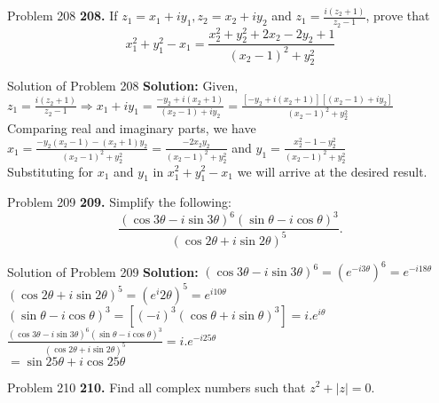 \documentclass[aspectratio=169,8pt]{beamer}
\begin{document}
\begin{frame}{Problem 208}
  \textbf{208.} If $z_1 = x_1 + iy_1, z_2 = x_2 + iy_2$ and $z_1 = \frac{i(z_2 + 1)}{z_2 - 1}$,  prove that
    $$x_1^2 + y_1^2 - x_1 = \frac{x_2^2 + y_2^2 + 2x_2 - 2y_2 + 1}{(x_2 - 1)^2 + y_2^2}$$
\end{frame}
\begin{frame}{Solution of Problem 208}
  \textbf{Solution:} Given, $z_1 = \frac{i(z_2 + 1)}{z_2 - 1} \Rightarrow x_1 + iy_1 = \frac{-y_2 + i(x_2 + 1)}{(x_2 - 1) + iy_2}
  = \frac{[-y_2 + i(x_2 + 1)][(x_2 - 1) + iy_2]}{(x_2 - 1)^2 + y_2^2}$
  \\\vspace*{0.2cm}
  Comparing real and imaginary parts, we have
  \\\vspace*{0.2cm}
  $x_1 = \frac{-y_2(x_2 - 1) -(x_2 + 1)y_2}{(x_2 - 1)^2 + y_2^2} = \frac{-2x_2y_2}{(x_2 - 1)^2 + y_2^2}$ and $y_1 = \frac{x_2^2 - 1
    - y_2^2}{(x_2 - 1)^2 + y_2^2}$
  \\\vspace*{0.2cm}
  Substituting for $x_1$ and $y_1$ in $x_1^2 + y_1^2 - x_1$ we will arrive at the desired result.
\end{frame}
\begin{frame}{Problem 209}
  \textbf{209.} Simplify the following:
  $$\frac{(\cos3\theta - i\sin3\theta)^6(\sin\theta - i\cos\theta)^3}{(\cos2\theta + i\sin2\theta)^5}.$$
\end{frame}
\begin{frame}{Solution of Problem 209}
  \textbf{Solution:} $(\cos3\theta - i\sin3\theta)^6 = (e^{-i3\theta})^6 = e^{-i18\theta}$
  \\\vspace*{0.2cm}
  $(\cos2\theta + i\sin2\theta)^5 = (e^i2\theta)^5 = e^{i10\theta}$
  \\\vspace*{0.2cm}
  $(\sin\theta - i\cos\theta)^3 = [(-i)^3(\cos\theta + i\sin\theta)^3] = i.e^{i\theta}$
  \\\vspace*{0.2cm}
  $\frac{(\cos3\theta - i\sin3\theta)^6(\sin\theta - i\cos\theta)^3}{(\cos2\theta + i\sin2\theta)^5} = i.e^{-i25\theta}$
  \\\vspace*{0.2cm}
  $= \sin25\theta + i\cos25\theta$
\end{frame}
\begin{frame}{Problem 210}
  \textbf{210.} Find all complex numbers such that $z^2 + |z| = 0$.
\end{frame}
\end{document}
